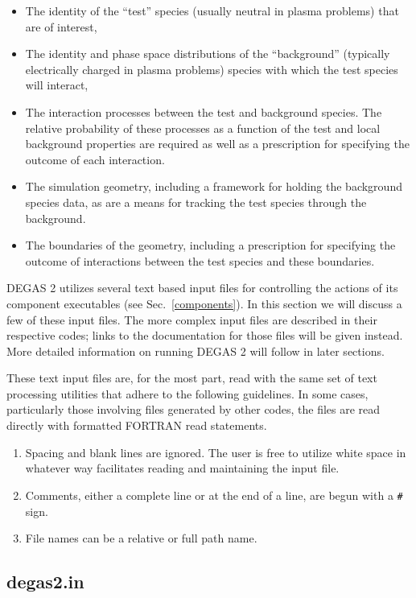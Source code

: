\documentclass[12pt]{report}
\begin{document}
\begin{itemize}
\item The identity of the ``test'' species (usually neutral in plasma problems)
that are of interest,
\item The identity and phase space distributions of the ``background''
(typically electrically charged in plasma problems)
species with which
the test species will interact, 
\item The interaction processes between the test and background species. 
The relative probability of these processes as a function of the 
test and local background properties are required as well as a 
prescription for specifying the outcome of each interaction.
\item The simulation geometry, including a framework for
holding the background species data, as are a means for tracking
the test species through the background.
\item The boundaries of the geometry, including a prescription
for specifying the outcome of interactions between the test species and
these boundaries.
\end{itemize}

DEGAS 2 utilizes several text based input files for controlling the actions
of its component executables (see Sec.~\ref{components}). 
In this section we will discuss a few of these input files. The more complex
input files are described in their respective codes; links to the documentation
for those files will be given instead. 
More
detailed information on running DEGAS 2 will follow in later sections.

These text input files are, for the most part, 
read with the same set of text processing utilities that adhere to the following
guidelines. In some cases, particularly
those involving files generated by other codes, the files are read directly
with formatted FORTRAN read statements.

\begin{enumerate}
  \item Spacing and blank lines are ignored. The user is free to utilize white
space in whatever way facilitates reading and maintaining the input file.
  \item Comments, either a complete line or at the end of a line, are begun
with a \verb+#+ sign.
  \item File names can be a relative or full path name.
\end{enumerate}

\subsection{degas2.in}
\label{degas2in}
\end{document}
